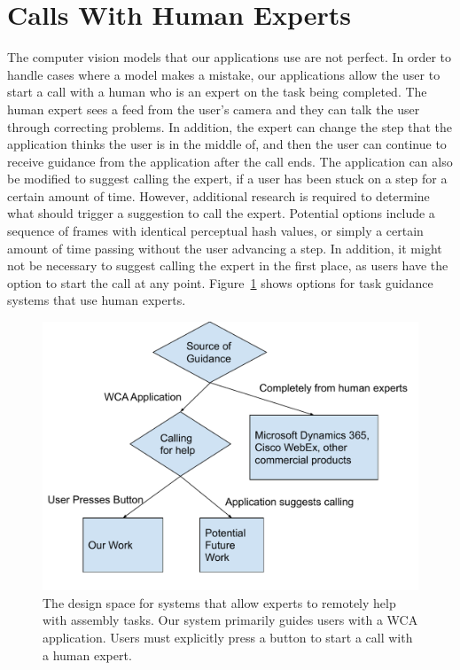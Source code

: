 \section{Calls With Human Experts}

The computer vision models that our applications use are not perfect. In order
to handle cases where a model makes a mistake, our applications allow the user
to start a call with a human who is an expert on the task being completed. The
human expert sees a feed from the user's camera and they can talk the user
through correcting problems. In addition, the expert can change the step that
the application thinks the user is in the middle of, and then the user can
continue to receive guidance from the application after the call ends.
The application can also be modified to suggest calling the expert, if a user
has been stuck on a step for a certain amount of time.
However, additional research is required to determine what should trigger a
suggestion to call the expert.
Potential options include a sequence of frames with identical perceptual hash
values, or simply a certain amount of time passing without the user advancing a
step.
In addition, it might not be necessary to suggest calling the expert in the
first place, as users have the option to start the call at any point.
Figure~\ref{fig:design_space} shows options for task guidance systems that use
human experts.

\begin{figure}[h]
  \includegraphics[width=14cm]{figures/design_space.pdf}
  \caption{The design space for systems that allow experts to remotely help with
    assembly tasks.
    Our system primarily guides users with a WCA application.
    Users must explicitly press a button to start a call with a human expert.
  }\label{fig:design_space}
\end{figure}

